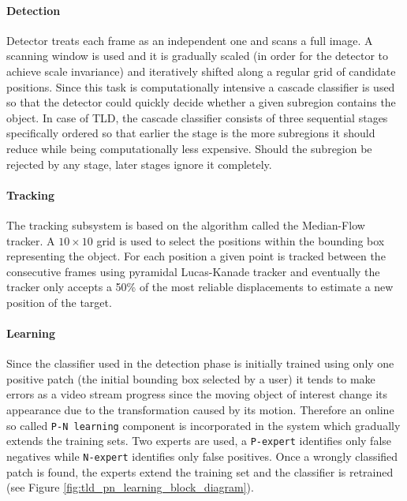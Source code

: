 \paragraph{Detection} Detector treats each frame as an independent one and scans a full image. A scanning window is used and it is gradually scaled (in order for the detector to achieve scale invariance) and iteratively shifted along a regular grid of candidate positions. Since this task is computationally intensive a cascade classifier is used so that the detector could quickly decide whether a given subregion contains the object. In case of TLD, the cascade classifier consists of three sequential stages specifically ordered so that earlier the stage is the more subregions it should reduce while being computationally less expensive. Should the subregion be rejected by any stage, later stages ignore it completely.

\paragraph{Tracking} The tracking subsystem is based on the algorithm called the Median-Flow tracker. A $10 \times 10$ grid is used to select the positions within the bounding box representing the object. For each position a given point is tracked between the consecutive frames using pyramidal Lucas-Kanade tracker and eventually the tracker only accepts a 50\% of the most reliable displacements to estimate a new position of the target.

\paragraph{Learning} Since the classifier used in the detection phase is initially trained using only one positive patch (the initial bounding box selected by a user) it tends to make errors as a video stream progress since the moving object of interest change its appearance due to the transformation caused by its motion. Therefore an online so called \texttt{P-N learning} component is incorporated in the system which gradually extends the training sets. Two experts are used, a \texttt{P-expert} identifies only false negatives while \texttt{N-expert} identifies only false positives. Once a wrongly classified patch is found, the experts extend the training set and the classifier is retrained (see Figure \ref{fig:tld_pn_learning_block_diagram}).

